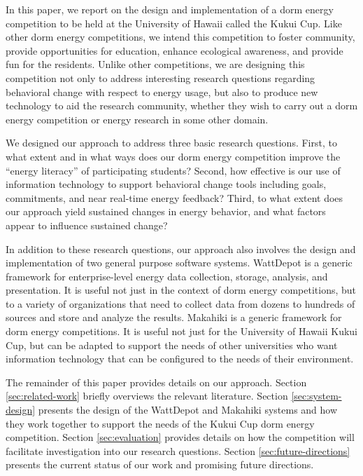 In this paper, we report on the design and implementation of a dorm energy
competition to be held at the University of Hawaii called the Kukui Cup.
Like other dorm energy competitions, we intend this competition to foster
community, provide opportunities for education, enhance ecological
awareness, and provide fun for the residents.  Unlike other competitions,
we are designing this competition not only to address interesting research
questions regarding behavioral change with respect to energy usage, but
also to produce new technology to aid the research community, whether they
wish to carry out a dorm energy competition or energy research in some
other domain. 

We designed our approach to address three basic research questions.  First,
to what extent and in what ways does our dorm energy competition improve
the ``energy literacy'' of participating students?  Second, how effective
is our use of information technology to support behavioral change tools
including goals, commitments, and near real-time energy feedback? Third, to
what extent does our approach yield sustained changes in energy behavior,
and what factors appear to influence sustained change?

In addition to these research questions, our approach also involves the
design and implementation of two general purpose software systems.
WattDepot is a generic framework for enterprise-level energy data
collection, storage, analysis, and presentation.  It is useful not just in
the context of dorm energy competitions, but to a variety of organizations
that need to collect data from dozens to hundreds of sources and store and
analyze the results.  Makahiki is a generic framework for dorm energy
competitions.  It is useful not just for the University of Hawaii Kukui
Cup, but can be adapted to support the needs of other universities who want
information technology that can be configured to the needs of their
environment.

The remainder of this paper provides details on our approach.  Section
\ref{sec:related-work} briefly overviews the relevant literature.  Section
\ref{sec:system-design} presents the design of the WattDepot and Makahiki
systems and how they work together to support the needs of the Kukui Cup
dorm energy competition.  Section \ref{sec:evaluation} provides details
on how the competition will facilitate investigation into our research questions. 
Section \ref{sec:future-directions} presents the current status of our work and promising future
directions. 

